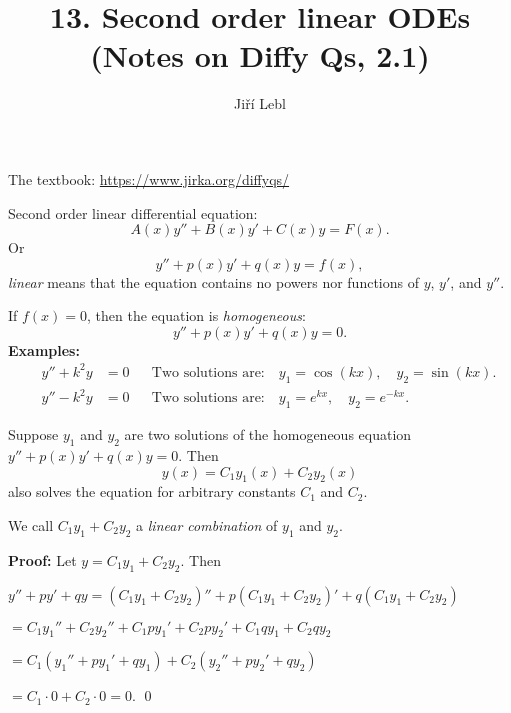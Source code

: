 \documentclass[10pt,aspectratio=169]{beamer}
\author{Ji\v{r}\'i Lebl}
\institute[OSU]{%
Oklahoma State University%
}
\title{13. Second order linear ODEs\\(Notes on Diffy Qs, 2.1)}
\date{}
\begin{document}
\begin{frame}
\titlepage


\begin{center}
The textbook: \url{https://www.jirka.org/diffyqs/}
\end{center}
\end{frame}

\begin{frame}
Second order linear differential equation:
\[
A(x) y'' + B(x)y' + C(x)y = F(x) .
\]
\pause
Or
\[
y'' + p(x)y' + q(x)y = f(x) ,
\]
\pause
\emph{linear} means that the 
equation contains no powers nor
functions of $y$, $y'$, and $y''$.
\medskip
\pause

If $f(x)=0$, then the equation is \emph{homogeneous}:
\[
y'' + p(x)y' + q(x)y = 0 .
\]
\pause
\textbf{Examples:}
\begin{align*}
\qquad y'' + k^2 y & = 0 &
& \text{Two solutions are:} \quad y_1 = \cos (kx), \quad y_2 = \sin(kx) . \qquad \\
\qquad y'' - k^2 y & = 0 &
& \text{Two solutions are:} \quad y_1 = e^{kx}, \quad y_2 = e^{-kx} . \qquad
\end{align*}
\end{frame}

\begin{frame}
\begin{theorem}[Superposition]
Suppose $y_1$ and $y_2$ are two solutions of the
homogeneous equation
$y'' + p(x)y' + q(x)y = 0$.
\pause
Then 
\[
y(x) = C_1 y_1(x) + C_2 y_2(x)
\]
also solves the equation for arbitrary constants $C_1$ and $C_2$.
\end{theorem}
\pause

We call $C_1 y_1 + C_2 y_2$ a \emph{linear combination} of $y_1$ and $y_2$.

\medskip
\pause

\textbf{Proof:}
Let 
$y = C_1 y_1 + C_2 y_2$.  \pause Then

\medskip
$y'' + py' + qy  = (C_1 y_1 + C_2 y_2)'' + p(C_1 y_1 + C_2 y_2)' + q(C_1 y_1
+ C_2 y_2)$

\pause
\phantom{$y'' + py' + qy$}%
${} = C_1 y_1'' + C_2 y_2'' + C_1 p y_1' + C_2 p y_2' + C_1 q y_1 + C_2 q y_2$

\pause
\phantom{$y'' + py' + qy$}%
${} = C_1 ( y_1'' + p y_1' + q y_1 ) + C_2 ( y_2'' + p y_2' + q y_2 )$

\pause
\phantom{$y'' + py' + qy$}%
${} = C_1 \cdot 0 + C_2 \cdot 0 = 0$. \qed

\end{frame}
\end{document}
